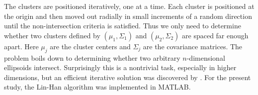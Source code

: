 \documentclass[10pt]{article}
\begin{document}
The clusters are positioned iteratively, one at a time. Each cluster is positioned at the origin and then moved out radially in small increments of a random direction until the non-intersection criteria is satisfied. Thus we only need to determine whether two clusters defined by $(\mu_1,\Sigma_1)$ and $(\mu_2,\Sigma_2)$ are spaced far enough apart. Here $\mu_j$ are the cluster centers and $\Sigma_j$ are the covariance matrices. The problem boils down to determining whether two arbitrary $n$-dimensional ellipsoids intersect. Surprisingly this is a nontrivial task, especially in higher dimensions, but an efficient iterative solution was discovered by \cite{ellipsoid-distance}. For the present study, the Lin-Han algorithm was implemented in MATLAB.



\end{document}
